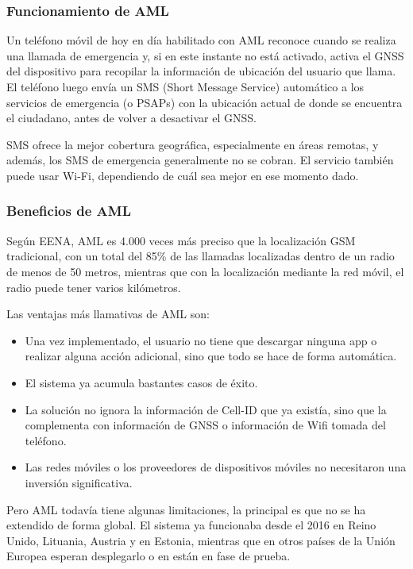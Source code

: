 \subsubsection{Funcionamiento de AML}

Un teléfono móvil de hoy en día habilitado con AML reconoce cuando se realiza una llamada de emergencia y, si en este instante no está activado, activa el GNSS del dispositivo para recopilar la información de ubicación del usuario que llama. El teléfono luego envía un SMS (Short Message Service) automático a los servicios de emergencia (o PSAPs) con la ubicación actual de donde se encuentra el ciudadano, antes de volver a desactivar el GNSS.

SMS ofrece la mejor cobertura geográfica, especialmente en áreas remotas, y además, los SMS de emergencia generalmente no se cobran. El servicio también puede usar Wi-Fi, dependiendo de cuál sea mejor en ese momento dado.

\subsubsection{Beneficios de AML}

Según EENA, AML es 4.000 veces más preciso que la localización GSM tradicional, con un total del 85\% de las llamadas localizadas dentro de un radio de menos de 50 metros, mientras que con la localización mediante la red móvil, el radio puede tener varios kilómetros.

Las ventajas más llamativas de AML son:

\begin{itemize}
  \item Una vez implementado, el usuario no tiene que descargar ninguna app o realizar alguna acción adicional, sino que todo se hace de forma automática.
  \item El sistema ya acumula bastantes casos de éxito.
  \item La solución no ignora la información de Cell-ID que ya existía, sino que la complementa con información de GNSS o información de Wifi tomada del teléfono.
  \item Las redes móviles o los proveedores de dispositivos móviles no necesitaron una inversión significativa.
\end{itemize}

Pero AML todavía tiene algunas limitaciones, la principal es que no se ha extendido de forma global. El sistema ya funcionaba desde el 2016 en Reino Unido, Lituania, Austria y en Estonia, mientras que en otros países de la Unión Europea esperan desplegarlo o en están en fase de prueba.

